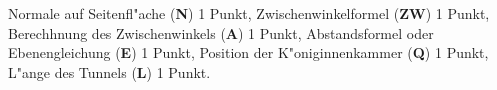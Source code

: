 \begin{bewertung}
Normale auf Seitenfl"ache ({\bf N}) 1 Punkt,
Zwischenwinkelformel ({\bf ZW}) 1 Punkt,
Berechhnung des Zwischenwinkels ({\bf A}) 1 Punkt,
Abstandsformel oder Ebenengleichung ({\bf E}) 1 Punkt,
Position der K"oniginnenkammer ({\bf Q}) 1 Punkt,
L"ange des Tunnels ({\bf L}) 1 Punkt.
\end{bewertung}

